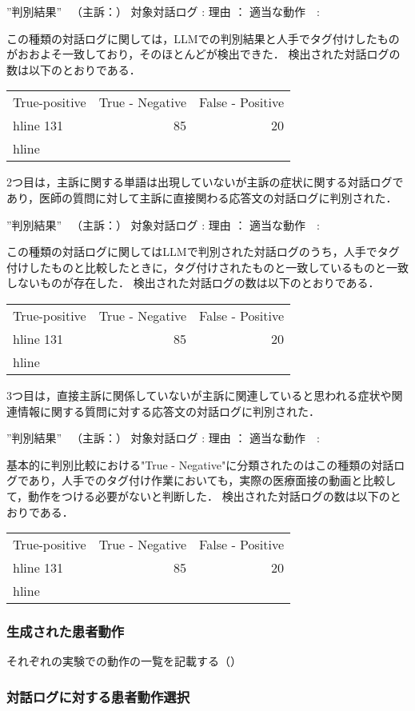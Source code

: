 ”判別結果” 　（主訴：）
  対象対話ログ  :
         理由  ：
    適当な動作　:

この種類の対話ログに関しては，LLMでの判別結果と人手でタグ付けしたものがおおよそ一致しており，そのほとんどが検出できた．
検出された対話ログの数は以下のとおりである．

\begin{tabular}{|l|r|r|} \hline
True-positive & True - Negative & False - Positive \\hline
131 & 85 & 20 \\hline
\end {tabular}

2つ目は，主訴に関する単語は出現していないが主訴の症状に関する対話ログであり，医師の質問に対して主訴に直接関わる応答文の対話ログに判別された．

”判別結果” 　（主訴：）
  対象対話ログ  :
         理由  ：
    適当な動作　:

この種類の対話ログに関してはLLMで判別された対話ログのうち，人手でタグ付けしたものと比較したときに，タグ付けされたものと一致しているものと一致しないものが存在した．
検出された対話ログの数は以下のとおりである．

\begin{tabular}{|l|r|r|} \hline
True-positive & True - Negative & False - Positive \\hline
131 & 85 & 20 \\hline
\end {tabular}

3つ目は，直接主訴に関係していないが主訴に関連していると思われる症状や関連情報に関する質問に対する応答文の対話ログに判別された．

”判別結果” 　（主訴：）
  対象対話ログ  :
         理由  ：
    適当な動作　:

基本的に判別比較における"True - Negative"に分類されたのはこの種類の対話ログであり，人手でのタグ付け作業においても，実際の医療面接の動画と比較して，動作をつける必要がないと判断した．
検出された対話ログの数は以下のとおりである．

\begin{tabular}{|l|r|r|} \hline
True-positive & True - Negative & False - Positive \\hline
131 & 85 & 20 \\hline
\end {tabular}

\subsubsection*{生成された患者動作}
それぞれの実験での動作の一覧を記載する（）


\subsubsection*{対話ログに対する患者動作選択}
